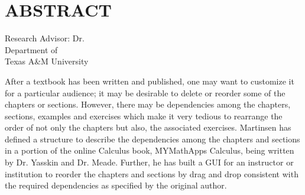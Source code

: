 %
%
%
%

\chapter*{ABSTRACT}


\pagestyle{plain} %
\setcounter{page}{1}
\begin{center}

\begin{singlespace}
\abstracttitle
\end{singlespace}
\vspace{2em}
\vspace{2em}
\begin{singlespace}
Research Advisor: Dr. \ursadvisor \\
Department of \advisordepartment \\
Texas A\&M University \\
\end{singlespace}
\end{center}
\vspace{2em}

\indent After a textbook has been written and published, one may want to customize it for a particular audience; it may be desirable to delete or reorder some of the chapters or sections. However, there may be dependencies among the chapters, sections, examples and exercises which make it very tedious to rearrange the order of not only the chapters but also, the associated exercises. Martinsen has defined a structure to describe the dependencies among the chapters and sections in a portion of the online Calculus book, MYMathApps Calculus, being written by Dr. Yasskin and Dr. Meade. Further, he has built a GUI for an instructor or institution to reorder the chapters and sections by drag and drop consistent with the required dependencies as specified by the original author.

\pagebreak{}
